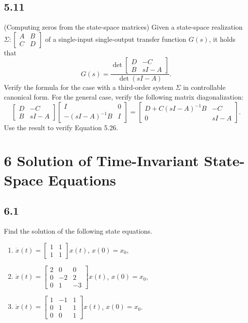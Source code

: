 \documentclass{article}
\newcommand{\problem}[2]{\subsection*{#1}}
\begin{document}
\problem{5.11}{}
(Computing zeros from the state-space matrices) Given a state-space realization $\Sigma : \left[\begin{array}{c|c} A & B \\ \hline C & D \end{array}\right]$ of a single-input single-output transfer function $G(s)$, it holds that
\[
G(s) = \frac{\det\begin{bmatrix} D & -C \\ B & sI - A \end{bmatrix}}{\det(sI - A)}. \tag{5.26}
\]
Verify the formula for the case with a third-order system $\Sigma$ in controllable canonical form. For the general case, verify the following matrix diagonalization:
\[
\begin{bmatrix} D & -C \\ B & sI - A \end{bmatrix}
\begin{bmatrix} I & 0 \\ -(sI - A)^{-1}B & I \end{bmatrix}
= \begin{bmatrix} D + C(sI - A)^{-1}B & -C \\ 0 & sI - A \end{bmatrix}.
\]
Use the result to verify Equation 5.26.

\section*{6 Solution of Time-Invariant State-Space Equations}

\problem{6.1}{}
Find the solution of the following state equations.
\begin{enumerate}
\item $\dot{x}(t) = \begin{bmatrix} 1 & 1 \\ 1 & 1 \end{bmatrix} x(t)$, $x(0) = x_0$,
\item $\dot{x}(t) = \begin{bmatrix} 2 & 0 & 0 \\ 0 & -2 & 2 \\ 0 & 1 & -3 \end{bmatrix} x(t)$, $x(0) = x_0$,
\item $\dot{x}(t) = \begin{bmatrix} 1 & -1 & 1 \\ 0 & 1 & 1 \\ 0 & 0 & 1 \end{bmatrix} x(t)$, $x(0) = x_0$.
\end{enumerate}
\end{document}
